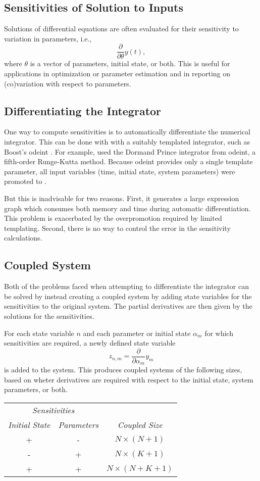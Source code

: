 \documentclass[10pt]{article}
\begin{document}
\subsection{Sensitivities of Solution to Inputs}

Solutions of differential equations are often evaluated for their
sensitivity to variation in parameters, i.e.,
\[
\frac{\partial}{\partial \theta} y(t),
\]
where $\theta$ is a vector of parameters, initial state, or both.
This is useful for applications in optimization or parameter
estimation and in reporting on (co)variation with respect to parameters.


\subsection{Differentiating the Integrator}

One way to compute sensitivities is to automatically differentiate the
numerical integrator.  This can be done with  with a
suitably templated integrator, such as Boost's odeint
\citep{AhnertMulansky:2014}. For example, \citep{WeberEtAl:2014} used
the Dormand Prince integrator from odeint, a fifth-order Runge-Kutta
method.  Because odeint provides only a single template parameter, all
input variables (time, initial state, system parameters) were promoted
to .

But this is inadvisable for two reasons.  First, it generates a large
expression graph which consumes both memory and time during automatic
differentiation.  This problem is exacerbated by the overpromotion
required by limited templating.  Second, there is no way to control
the error in the sensitivity calculations.


\subsection{Coupled System}

Both of the problems faced when attempting to differentiate the
integrator can be solved by instead creating a coupled system by
adding state variables for the sensitivities to the original system.
The partial derivatives are then given by the solutions for the
sensitivities.  

For each state variable $n$ and each parameter or initial state
$\alpha_m$ for which sensitivities are required, a newly defined state
variable
\[
z_{n,m} = \frac{\partial}{\partial \alpha_m} y_m
\]
is added to the system.  This produces coupled systems of the
following sizes, based on wheter derivatives are required with respect
to the initial state, system parameters, or both.
%
\begin{center}
\begin{tabular}{cc|c}
\multicolumn{2}{c|}{\it Sensitivities} &
\\
{\it Initial State} & {\it Parameters} & {\it Coupled Size}
\\ \hline
+ & - & $N \times (N + 1)$
\\
- & + & $N \times (K + 1)$ 
\\
+ & + & $N \times (N + K + 1)$
\end{tabular}
\end{center} 
\end{document}
